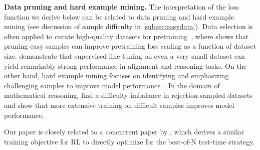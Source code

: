 \textbf{Data pruning and hard example mining.} The interpretation of the loss function we derive below can be related to data pruning and hard example mining (see discussion of sample difficulty in \cref{subsec:easydata}). Data selection is often applied to curate high-quality datasets for pretraining~\cite{datacuration}, where \citet{datapruning} shows that pruning easy samples can improve pretraining loss scaling as a function of dataset size. \citet{LIMA,ye2025limoreasoning} demonstrate that supervised fine-tuning on even a very small dataset can yield remarkably strong performance in alignment and reasoning tasks.
%
On the other hand, hard example mining focuses on identifying and emphasizing challenging samples to improve model performance~\cite{hardexamplemining}.
%
In the domain of mathematical reasoning, \citet{tong2024dartmath} find a difficulty imbalance in rejection-sampled datasets and show that more extensive training on difficult samples improves model performance.
%

Our paper is closely related to a concurrent paper by \citet{chow2024inference}, which derives a similar training objective for RL to directly optimize for the best-of-N test-time strategy.